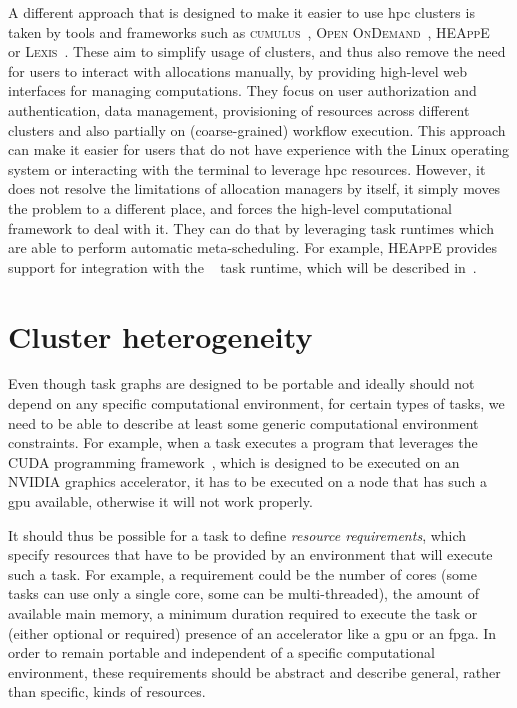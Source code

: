 A different approach that is designed to make it easier to use \gls{hpc} clusters is
taken by tools and frameworks such as \textsc{cumulus}~\cite{cumulus},
\textsc{Open OnDemand}~\cite{openondemand}, \textsc{HEAppE}~\cite{heappe} or
\textsc{Lexis}~\cite{lexis}. These aim to simplify usage of clusters, and thus
also remove the need for users to interact with allocations manually, by providing high-level web
interfaces for managing computations. They focus on user authorization and authentication, data
management, provisioning of resources across different clusters and also partially on
(coarse-grained) workflow execution. This approach can make it easier for users that do not have
experience with the Linux operating system or interacting with the terminal to leverage
\gls{hpc} resources. However, it does not resolve the limitations of allocation
managers by itself, it simply moves the problem to a different place, and forces the high-level
computational framework to deal with it. They can do that by leveraging task runtimes which are
able to perform automatic meta-scheduling. For example, \textsc{HEAppE} provides support
for integration with the \hyperqueue{}~\cite{heappe_hq} task runtime, which will
be described in~.

\section{Cluster heterogeneity}
\label{challenge:heterogeneity}
Even though task graphs are designed to be portable and ideally should not depend on any specific
computational environment, for certain types of tasks, we need to be able to describe at least some
generic computational environment constraints. For example, when a task executes a program that
leverages the CUDA programming framework~\cite{cuda}, which is designed to be executed
on an NVIDIA graphics accelerator, it has to be executed on a node that has such a
\gls{gpu} available, otherwise it will not work properly.

It should thus be possible for a task to define \emph{resource requirements}, which specify resources
that have to be provided by an environment that will execute such a task. For example, a
requirement could be the number of cores (some tasks can use only a single core, some can be
multi-threaded), the amount of available main memory, a minimum duration required to execute the
task or (either optional or required) presence of an accelerator like a \gls{gpu} or
an \gls{fpga}. In order to remain portable and independent of a specific computational
environment, these requirements should be abstract and describe general, rather than specific,
kinds of resources.


